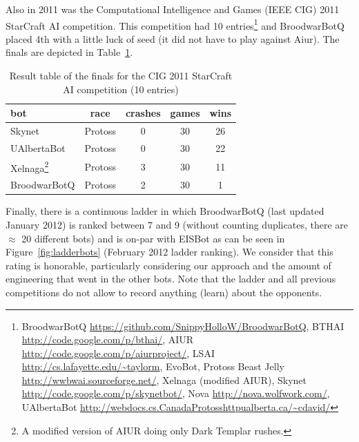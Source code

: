 Also in 2011 was the Computational Intelligence and Games (IEEE CIG) 2011 StarCraft AI competition. This competition had 10 entries\footnote{BroodwarBotQ \url{https://github.com/SnippyHolloW/BroodwarBotQ}, BTHAI \url{http://code.google.com/p/bthai/}, AIUR \url{http://code.google.com/p/aiurproject/}, LSAI \url{http://cs.lafayette.edu/~taylorm}, 
EvoBot, Protoss Beast Jelly \url{http://wwbwai.sourceforge.net/}, Xelnaga (modified AIUR), Skynet \url{http://code.google.com/p/skynetbot/}, Nova \url{http://nova.wolfwork.com/}, UAlbertaBot \url{http://webdocs.cs.CanadaProtosshttpualberta.ca/~cdavid/}} and BroodwarBotQ placed 4th with a little luck of seed (it did not have to play against Aiur). The finals are depicted in Table~\ref{tab:botsCIG}.
\begin{table}[h]
    \begin{center}
    \begin{tabular}{|l|c|c|c|c|}
        \hline
bot & race & crashes & games & wins \\ 
        \hline
Skynet & Protoss & 0 & 30 & 26 \\ 
UAlbertaBot & Protoss & 0 & 30 &  22\\
Xelnaga\footnote{A modified version of AIUR doing only Dark Templar rushes.} & Protoss & 3 & 30 & 11 \\
BroodwarBotQ & Protoss & 2 & 30 & 1\\
        \hline
    \end{tabular}
    \end{center}
    \caption{Result table of the finals for the CIG 2011 StarCraft AI competition (10 entries)}
    \label{tab:botsCIG}
\end{table}

Finally, there is a continuous ladder in which BroodwarBotQ (last updated January 2012) is ranked between 7 and 9 (without counting duplicates, there are $\approx$ 20 different bots) and is on-par with EISBot \citep{WeberCIG10,Weber2010cr} as can be seen in Figure~\ref{fig:ladderbots} (February 2012 ladder ranking). We consider that this rating is honorable, particularly considering our approach and the amount of engineering that went in the other bots. Note that the ladder and all previous competitions do not allow to record anything (learn) about the opponents.


